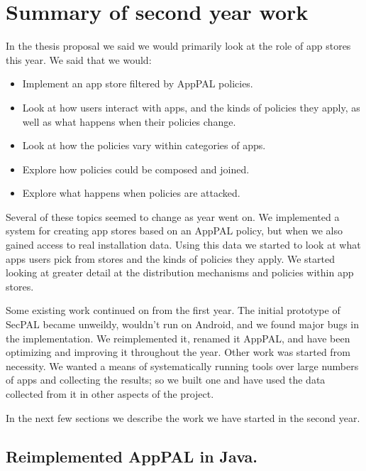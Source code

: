 \documentclass[a4paper]{scrartcl}
\begin{document}
\section{Summary of second year work}


In the thesis proposal we said we would primarily look at the role of app stores this year.
We said that we would:

\begin{itemize}
  \item Implement an app store filtered by AppPAL policies.
  \item Look at how users interact with apps, and the kinds of policies they apply, as well as what happens when their policies change.
  \item Look at how the policies vary within categories of apps.
  \item Explore how policies could be composed and joined.
  \item Explore what happens when policies are attacked.
\end{itemize}

Several of these topics seemed to change as year went on.
We implemented a system for creating app stores based on an AppPAL policy, but when we also gained access to real installation data.
Using this data we started to look at what apps users pick from stores and the kinds of policies they apply.
We started looking at greater detail at the distribution mechanisms and policies within app stores.

Some existing work continued on from the first year.
The initial prototype of SecPAL became unweildy, wouldn't run on Android, and we found major bugs in the implementation.
We reimplemented it, renamed it AppPAL, and have been optimizing and improving it throughout the year.
Other work was started from necessity.
We wanted a means of systematically running tools over large numbers of apps and collecting the results;
  so we built one and have used the data collected from it in other aspects of the project.

In the next few sections we describe the work we have started in the second year.

\subsection{Reimplemented AppPAL in Java.}
\end{document}
